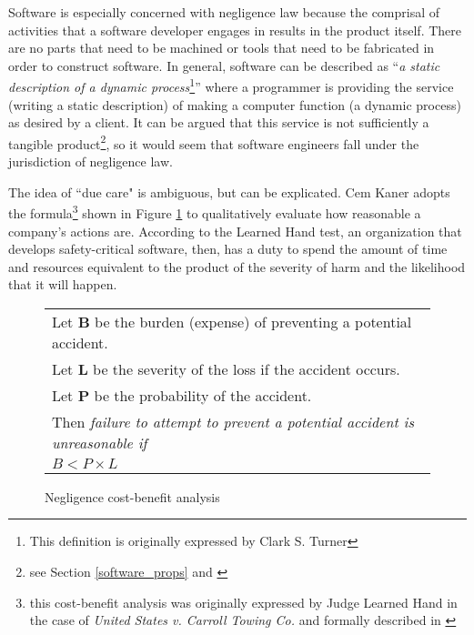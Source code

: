 Software is especially concerned with negligence law because the comprisal of
activities that a software developer engages in results in the product itself.
There are no parts that need to be machined or tools that need to be fabricated
in order to construct software. In general, software can be described as 
``\textit{a static description of a dynamic process}\footnote{This definition
is originally expressed by Clark S. Turner}'' where a programmer is providing
the service (writing a static description) of making a computer function (a
dynamic process) as desired by a client. It can be argued that this service is
not sufficiently a tangible product\footnote{see Section \ref{software_props}
and \cite{Turner2000}}, so it would seem that software engineers fall under the
jurisdiction of negligence law.

The idea of ``due care" is ambiguous, but can be explicated. Cem Kaner adopts
the formula\footnote{this cost-benefit analysis was originally expressed by
Judge Learned Hand in the case of  \textit{United States v. Carroll Towing Co.}
and formally described in \cite{Kaner_neg_1995}} shown in Figure 
\ref{fig:negligence} to qualitatively evaluate how reasonable a company's
actions are. According to the Learned Hand test, an organization that develops 
safety-critical software, then, has a duty to spend the amount of time and
resources equivalent to the product of the severity of harm and the likelihood
that it will happen.

\begin{figure}
\begin{narrow}{-1.5in}{-1.5in}\begin{center}
\begin{tabular}{|l|}
\hline
	Let \textbf{B} be the burden (expense) of preventing a potential accident.\\
	Let \textbf{L} be the severity of the loss if the accident occurs.\\
	Let \textbf{P} be the probability of the accident.\\[6pt]
	Then \textit{failure to attempt to prevent a potential accident is 
	unreasonable if}\\[8pt]

      \centerline{\(B < P \times L\)}
\\[3pt]
\hline
\end{tabular}
\end{center}\end{narrow}
\caption{Negligence cost-benefit analysis}
\label{fig:negligence}
\end{figure}

